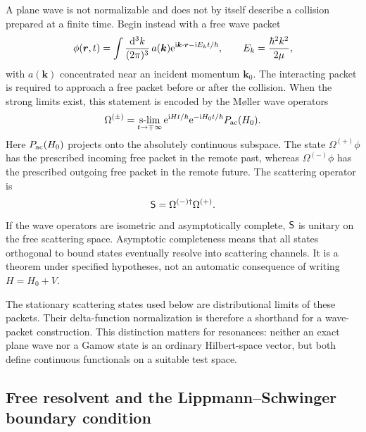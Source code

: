 A plane wave is not normalizable and does not by itself describe a collision
prepared at a finite time.  Begin instead with a free wave packet
\begin{equation}
  \phi(\bm r,t)
  =\int\frac{\mathrm{d}^3k}{(2\pi)^3}\,
  a(\bm k)\mathrm{e}^{\mathrm{i}\bm k\cdot\bm r-\mathrm{i} E_k t/\hbar},
  \qquad
  E_k=\frac{\hbar^2k^2}{2\mu},
  \label{eq:free-wave-packet}
\end{equation}
with $a(\bm k)$ concentrated near an incident momentum $\bm k_0$.  The
interacting packet is required to approach a free packet before or after the
collision.  When the strong limits exist, this statement is encoded by the
M{\o}ller wave operators
\begin{equation}
  \Omega^{(\pm)}
  =\operatorname*{s-lim}_{t\to\mp\infty}
  \mathrm{e}^{\mathrm{i} Ht/\hbar}\mathrm{e}^{-\mathrm{i} H_0t/\hbar}P_{\mathrm{ac}}(H_0) .
  \label{eq:moller-wave-operators}
\end{equation}
Here $P_{\mathrm{ac}}(H_0)$ projects onto the absolutely continuous
subspace.  The state $\Omega^{(+)}\phi$ has the prescribed incoming free
packet in the remote past, whereas $\Omega^{(-)}\phi$ has the prescribed
outgoing free packet in the remote future.  The scattering operator is
\begin{equation}
  \mathsf{S}=\Omega^{(-)\dagger}\Omega^{(+)} .
  \label{eq:scattering-operator-wave}
\end{equation}
If the wave operators are isometric and asymptotically complete,
$\mathsf{S}$ is unitary on the free scattering space.  Asymptotic
completeness means that all states orthogonal to bound states eventually
resolve into scattering channels.  It is a theorem under specified
hypotheses, not an automatic consequence of writing $H=H_0+V$.

The stationary scattering states used below are distributional limits of
these packets.  Their delta-function normalization is therefore a shorthand
for a wave-packet construction.  This distinction matters for resonances:
neither an exact plane wave nor a Gamow state is an ordinary Hilbert-space
vector, but both define continuous functionals on a suitable test space.

\subsection{Free resolvent and the Lippmann--Schwinger boundary condition}
\label{subsec:free-resolvent-ls}

